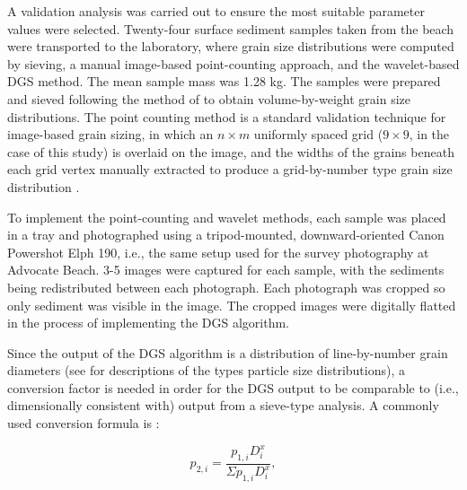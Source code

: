 \documentclass[preprint,12pt,authoryear]{elsarticle}
\begin{document}
A validation analysis was carried out to ensure the most suitable parameter values were selected. Twenty-four surface sediment samples taken from the beach were transported to the laboratory, where grain size distributions were computed by sieving, a manual image-based point-counting approach, and the wavelet-based DGS method. The mean sample mass was 1.28 kg. The samples were prepared and sieved following the method of \citet{Ingram1971} to obtain volume-by-weight grain size distributions. The point counting method is a standard validation technique for image-based grain sizing, in which an $n\times m$ uniformly spaced grid ($9\times 9$, in the case of this study) is overlaid on the image, and the widths of the grains beneath each grid vertex manually extracted to produce a grid-by-number type grain size distribution \citep[e.g.,][]{Barnard_etal2007, Buscombe_etal2010}. 

To implement the point-counting and wavelet methods, each sample was placed in a tray and photographed using a tripod-mounted, downward-oriented Canon Powershot Elph 190, i.e., the same setup used for the survey photography at Advocate Beach. 3-5 images were captured for each sample, with the sediments being redistributed between each photograph. Each photograph was cropped so only sediment was visible in the image. The cropped images were digitally flatted in the process of implementing the DGS algorithm.

Since the output of the DGS algorithm is a distribution of line-by-number grain diameters (see \citet{Kellerhals_Bray1971, Church_etal1987} for descriptions of the types particle size distributions), a conversion factor is needed in order for the DGS output to be comparable to (i.e., dimensionally consistent with) output from a sieve-type analysis. A commonly used conversion formula is \citep[e.g.][]{Kellerhals_Bray1971, Diplas_Sutherland1988, Cuttler_etal2017}:

\begin{equation}\label{eq:surface_area_to_volume}
p_{2,i} = \frac{p_{1,i} D_{i}^{x}}{\Sigma p_{1,i} D_{i}^{x}},
\end{equation}
\end{document}
